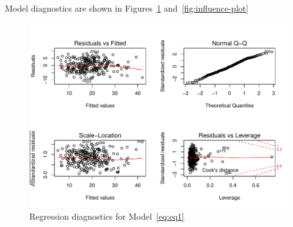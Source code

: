 \documentclass[11pt,letter]{article}\usepackage[]{graphicx}\usepackage[]{color}
\makeatletter
\def\maxwidth{ %
  \ifdim\Gin@nat@width>\linewidth
    \linewidth
  \else
    \Gin@nat@width
  \fi
}
\newenvironment{knitrout}{}{} %
\makeatother
\begin{document}
Model diagnostics are shown in Figures~\ref{fig:fig-diagnostics} and~\ref{fig:influence-plot}

\begin{knitrout}
\color{fgcolor}\begin{figure}[h]

{\centering \includegraphics[width=\maxwidth]{figure/fig-diagnostics-1} 

}

\caption{Regression diagnostics for Model~\eqref{eq:eq1}}\label{fig:fig-diagnostics}
\end{figure}


\end{knitrout}
\end{document}
